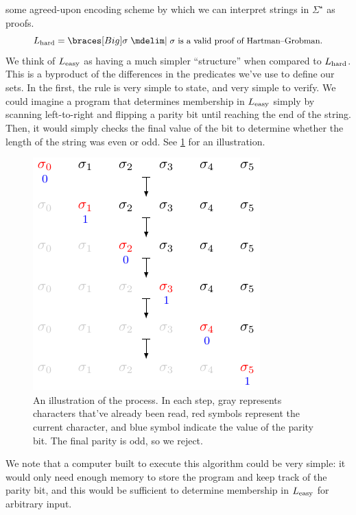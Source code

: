 \documentclass{fkpaper}
\begin{document}
\begin{multicols}{2}
{    some agreed-upon encoding scheme by which we can interpret strings
    in $\Sigma^\star$ as proofs.}
  \[
    L_{\rm hard} = \set[Big]{\sigma \MID \text{\small $\sigma$ is a
        valid proof of Hartman–Grobman.}}
  \]
  We think of $L_{\rm easy}$ as having a much simpler ``structure'' when
  compared to $L_{\rm hard}$. This is a byproduct of the differences in
  the predicates we've use to define our sets. In the first, the rule is
  very simple to state, and very simple to verify. We could imagine a
  program that determines membership in $L_{\rm easy}$ simply by
  scanning left-to-right and flipping a parity bit until reaching the
  end of the string. Then, it would simply checks the final value of the
  bit to determine whether the length of the string was even or odd. See
  \cref{fig:illustration-of-process} for an illustration.
  \begin{figure}[H]
    \centering
    \includegraphics{figures/parity-checker.pdf}
    \caption{An illustration of the process. In each step, gray
      represents characters that've already been read, red symbols
      represent the current character, and blue symbol indicate the
      value of the parity bit. The final parity is odd, so we reject.}
    \label{fig:illustration-of-process}
  \end{figure}
  We note that a computer built to execute this algorithm could be very
  simple: it would only need enough memory to store the program and keep
  track of the parity bit, and this would be sufficient to determine
  membership in $L_{\rm easy}$ for arbitrary input.


\end{multicols}
\end{document}
